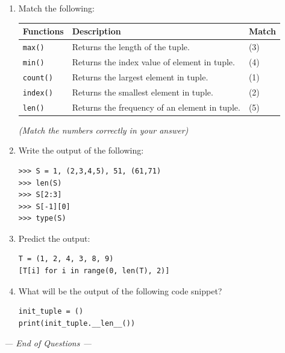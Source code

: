 \documentclass[11pt,a4paper]{article}
\begin{document}
\begin{enumerate}[label=\textbf{Q\arabic*.}]
\item Match the following:

\begin{center}
\begin{tabular}{|l|l|l|}
\hline
\textbf{Functions} & \textbf{Description} & \textbf{Match} \\
\hline
\texttt{max()} & Returns the length of the tuple. & (3) \\
\texttt{min()} & Returns the index value of element in tuple. & (4) \\
\texttt{count()} & Returns the largest element in tuple. & (1) \\
\texttt{index()} & Returns the smallest element in tuple. & (2) \\
\texttt{len()} & Returns the frequency of an element in tuple. & (5) \\
\hline
\end{tabular}
\end{center}
\textit{(Match the numbers correctly in your answer)}

\item Write the output of the following:
\begin{lstlisting}
>>> S = 1, (2,3,4,5), 51, (61,71)
>>> len(S)
>>> S[2:3]
>>> S[-1][0]
>>> type(S)
\end{lstlisting}

\item Predict the output:
\begin{lstlisting}
T = (1, 2, 4, 3, 8, 9)
[T[i] for i in range(0, len(T), 2)]
\end{lstlisting}

\item What will be the output of the following code snippet?
\begin{lstlisting}
init_tuple = ()
print(init_tuple.__len__())
\end{lstlisting}

\end{enumerate}

\vspace{1em}
\begin{center}
\textit{--- End of Questions ---}
\end{center}
\end{document}
